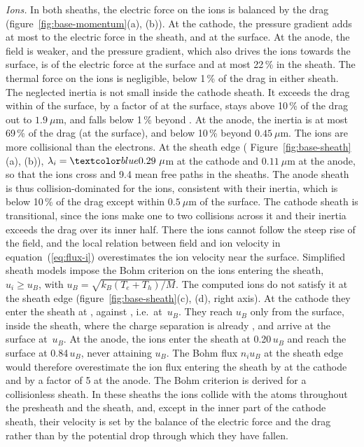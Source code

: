 \emph{Ions.} In both sheaths, the electric force on the ions is balanced by the drag (figure~\ref{fig:base-momentum}(a), (b)). At the cathode, the pressure gradient adds at most  to the electric force in the sheath, and  at the surface. At the anode, the field is weaker, and the pressure gradient, which also drives the ions towards the surface, is  of the electric force at the surface and at most 22\,\% in the sheath. The thermal force on the ions is negligible, below 1\,\% of the drag in either sheath. The neglected inertia is not small inside the cathode sheath. It exceeds the drag within  of the surface, by a factor of  at the surface, stays above 10\,\% of the drag out to \(1.9\ \mu\)m, and falls below 1\,\% beyond . At the anode, the inertia is at most 69\,\% of the drag (at the surface), and below 10\,\% beyond \(0.45\ \mu\)m. The ions are more collisional than the electrons. At the sheath edge ( Figure~\ref{fig:base-sheath}(a), (b)), \(\lambda_i=\rev{0.29}\ \mu\)m at the cathode and \(0.11\ \mu\)m at the anode, so that the ions cross  and 9.4 mean free paths in the sheaths. The anode sheath is thus collision-dominated for the ions, consistent with their inertia, which is below 10\,\% of the drag except within \(0.5\ \mu\)m of the surface. The cathode sheath is transitional, since the ions make one to two collisions across it and their inertia exceeds the drag over its inner half. There the ions cannot follow the steep rise of the field, and the local relation between field and ion velocity in equation~(\ref{eq:flux-i}) overestimates the ion velocity near the surface. Simplified sheath models impose the Bohm criterion on the ions entering the sheath, \(u_i\ge u_B\), with \(u_B=\sqrt{k_B(T_e+T_h)/M}\). The computed ions do not satisfy it at the sheath edge (figure~\ref{fig:base-sheath}(c), (d), right axis). At the cathode they enter the sheath at , against , i.e.\ at \,\(u_B\). They reach \(u_B\) only  from the surface, inside the sheath, where the charge separation is already , and arrive at the surface at \,\(u_B\). At the anode, the ions enter the sheath at 0.20\,\(u_B\) and reach the surface at 0.84\,\(u_B\), never attaining \(u_B\). The Bohm flux \(n_iu_B\) at the sheath edge would therefore overestimate the ion flux entering the sheath by  at the cathode and by a factor of 5 at the anode. The Bohm criterion is derived for a collisionless sheath. In these sheaths the ions collide with the atoms throughout the presheath and the sheath, and, except in the inner part of the cathode sheath, their velocity is set by the balance of the electric force and the drag rather than by the potential drop through which they have fallen.

